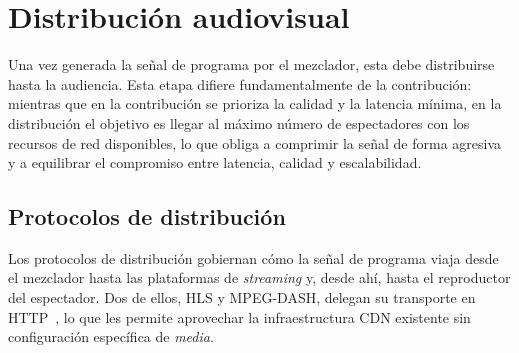 \section{Distribución audiovisual}
\label{sec:distribucion_av}

Una vez generada la señal de programa por el mezclador, esta debe distribuirse hasta
la audiencia. Esta etapa difiere fundamentalmente de la contribución: mientras que en
la contribución se prioriza la calidad y la latencia mínima, en la distribución el
objetivo es llegar al máximo número de espectadores con los recursos de red disponibles,
lo que obliga a comprimir la señal de forma agresiva y a equilibrar el compromiso entre
latencia, calidad y escalabilidad.

\subsection{Protocolos de distribución}

Los protocolos de distribución gobiernan cómo la señal de programa viaja desde el
mezclador hasta las plataformas de \textit{streaming} y, desde ahí, hasta el reproductor del
espectador. Dos de ellos, HLS y MPEG-DASH, delegan su transporte en HTTP~\cite{rfc9110_http},
lo que les permite aprovechar la infraestructura CDN existente sin configuración
específica de \textit{media}.

